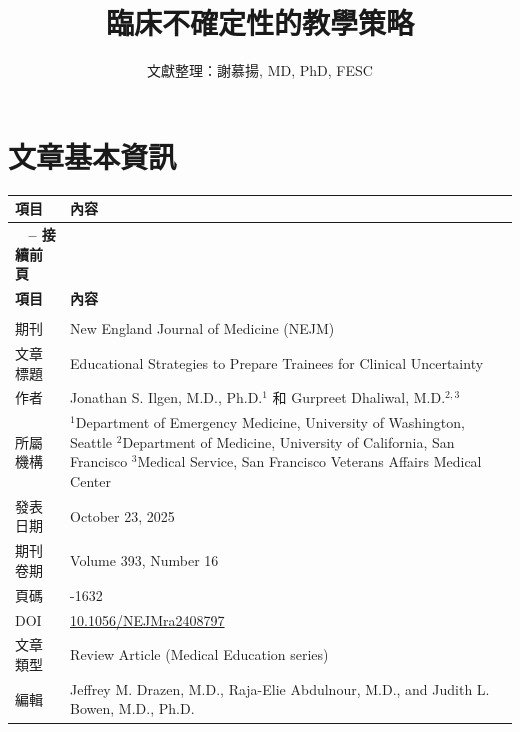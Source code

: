 \documentclass[12pt,a4paper]{article}
\newcommand{\mydate}{\DTMtoday}
\begin{document}
\title{\textcolor{emergency_red}{臨床不確定性的教學策略}}
\author{\textcolor{emergency_blue}{文獻整理：謝慕揚, MD, PhD, FESC}}
\date{\textcolor{emergency_gray}{\mydate}}
\maketitle

\section{文章基本資訊}

\begin{longtable}{>{\raggedright\arraybackslash}p{3cm} >{\raggedright\arraybackslash}p{12cm}}
\toprule
\textbf{\textcolor{emergency_red}{項目}} & \textbf{\textcolor{emergency_red}{內容}} \\
\midrule
\endfirsthead

\multicolumn{2}{c}%
{{\bfseries \tablename\ \thetable{} -- 接續前頁}} \\
\toprule
\textbf{\textcolor{emergency_red}{項目}} & \textbf{\textcolor{emergency_red}{內容}} \\
\midrule
\endhead

\midrule \multicolumn{2}{r}{{接續下頁}} \\ \midrule
\endfoot

\bottomrule
\endlastfoot

期刊 & New England Journal of Medicine (NEJM) \\
文章標題 & Educational Strategies to Prepare Trainees for Clinical Uncertainty \\
作者 & Jonathan S. Ilgen, M.D., Ph.D.$^1$ 和 Gurpreet Dhaliwal, M.D.$^{2,3}$ \\
所屬機構 & $^1$Department of Emergency Medicine, University of Washington, Seattle \newline $^2$Department of Medicine, University of California, San Francisco \newline $^3$Medical Service, San Francisco Veterans Affairs Medical Center \\
發表日期 & October 23, 2025 \\
期刊卷期 & Volume 393, Number 16 \\
頁碼 & 1624-1632 \\
DOI & \href{https://doi.org/10.1056/NEJMra2408797}{10.1056/NEJMra2408797} \\
文章類型 & Review Article (Medical Education series) \\
編輯 & Jeffrey M. Drazen, M.D., Raja-Elie Abdulnour, M.D., and Judith L. Bowen, M.D., Ph.D. \\
\end{longtable}
\end{document}
